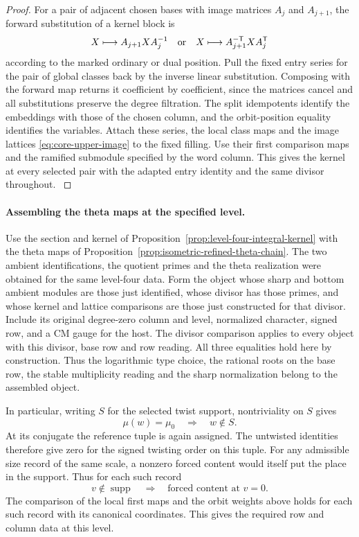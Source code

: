 \begin{proof}
For a pair of adjacent chosen bases with image matrices \(A_j\)
and \(A_{j+1}\), the forward substitution of a kernel block is
\[
 X\longmapsto A_{j+1}XA_j^{-1}
 \quad\hbox{or}\quad
 X\longmapsto A_{j+1}^{-\mathsf T}X A_j^{\mathsf T}
\]
according to the marked ordinary or dual position. Pull the
fixed entry series for the pair of global classes back by the
inverse linear substitution. Composing with the forward map
returns it coefficient by coefficient, since the matrices
cancel and all substitutions preserve the degree filtration.
The split idempotents identify the embeddings with those of
the chosen column, and the orbit-position equality identifies
the variables. Attach these series, the local class maps and
the image lattices \eqref{eq:core-upper-image} to the fixed
filling. Use their first comparison maps and the ramified
submodule specified by the word column. This gives the kernel
at every selected pair with the adapted entry identity and the
same divisor throughout. \label{cor:level-four-core-12}
\end{proof}

\paragraph{Assembling the theta maps at the specified level.}
Use the section and kernel of Proposition~\ref{prop:level-four-integral-kernel}
with the theta maps of Proposition~\ref{prop:isometric-refined-theta-chain}.
The two ambient identifications, the quotient primes and the
theta realization were obtained for the same level-four data.
Form the object whose sharp and bottom ambient modules are those
just identified, whose divisor has those primes, and whose
kernel and lattice comparisons are those just constructed for
that divisor. Include its original degree-zero column and
level, normalized character, signed row, and a CM gauge for the
host. The divisor comparison applies to every object with
this divisor, base row and row reading. All three equalities
hold here by construction. Thus the logarithmic type choice,
the rational roots on the base row, the stable multiplicity
reading and the sharp normalization belong to the assembled
object.

In particular, writing \(S\) for the selected twist support, nontriviality on \(S\) gives
\[
 \mu(w)=\mu_0\quad\Longrightarrow\quad w\notin S .
\] At its conjugate the reference tuple is again
assigned. The untwisted identities therefore give zero for the
signed twisting order on this tuple. For any admissible size record of the same scale, a nonzero forced content would itself put the place in the support. Thus for each such record
\[
 v\notin\operatorname{supp}\quad\Longrightarrow\quad\text{forced content at }v=0 .
\] The comparison of
the local first maps and the orbit weights above holds for
each such record with its canonical coordinates. This gives
the required row and column data at this level.
\label{cor:level-four-core-13}

